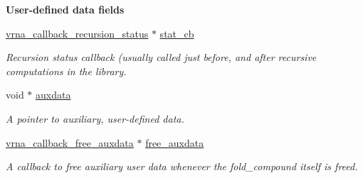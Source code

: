 \begin{Indent}{\bf User-\/defined data fields}\par
\begin{DoxyCompactItemize}
\item 
\hyperlink{group__fold__compound_ga4a4a0d838de6d18315bafc84f93f5cc0}{vrna\+\_\+callback\+\_\+recursion\+\_\+status} $\ast$ \hyperlink{group__fold__compound_a87a83f6795b569000efcbe65acc3dd81}{stat\+\_\+cb}
\begin{DoxyCompactList}\small\item\em Recursion status callback (usually called just before, and after recursive computations in the library. \end{DoxyCompactList}\item 
void $\ast$ \hyperlink{group__fold__compound_a20048e0c369e9f24b55423d600037c68}{auxdata}
\begin{DoxyCompactList}\small\item\em A pointer to auxiliary, user-\/defined data. \end{DoxyCompactList}\item 
\hyperlink{group__fold__compound_ga3ae51bfd5fc3236652d1de4e3274b49b}{vrna\+\_\+callback\+\_\+free\+\_\+auxdata} $\ast$ \hyperlink{group__fold__compound_a8e84dbabab016ecd74da6c38cb94e816}{free\+\_\+auxdata}
\begin{DoxyCompactList}\small\item\em A callback to free auxiliary user data whenever the fold\+\_\+compound itself is free\textquotesingle{}d. \end{DoxyCompactList}\end{DoxyCompactItemize}
\end{Indent}
